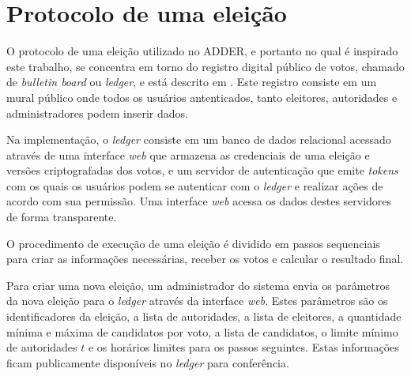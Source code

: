 \section{Protocolo de uma eleição}

O protocolo de uma eleição utilizado no ADDER, e portanto no qual é inspirado
este trabalho, se concentra em torno do registro digital público de votos,
chamado de \textit{bulletin board} ou \textit{ledger}, e está descrito em
\textcite{benaloh1987verifiable}. Este registro consiste em um mural público
onde todos os usuários antenticados, tanto eleitores, autoridades e
administradores podem inserir dados.

Na implementação, o \textit{ledger} consiste em um banco de dados relacional
acessado através de uma interface \textit{web} que armazena as credenciais de
uma eleição e versões criptografadas dos votos, e um servidor de autenticação
que emite \textit{tokens} com os quais os usuários podem se autenticar com o
\textit{ledger} e realizar ações de acordo com sua permissão. Uma interface
\textit{web} acessa os dados destes servidores de forma transparente.

O procedimento de execução de uma eleição é dividido em passos sequenciais para
criar as informações necessárias, receber os votos e calcular o resultado
final.

Para criar uma nova eleição, um administrador do sistema envia os parâmetros da
nova eleição para o \textit{ledger} através da interface \textit{web}. Estes
parâmetros são os identificadores da eleição, a lista de autoridades, a lista
de eleitores, a quantidade mínima e máxima de candidatos por voto, a lista de
candidatos, o limite mínimo de autoridades $t$ e os horários limites para os
passos seguintes. Estas informações ficam publicamente disponíveis no
\textit{ledger} para conferência.

